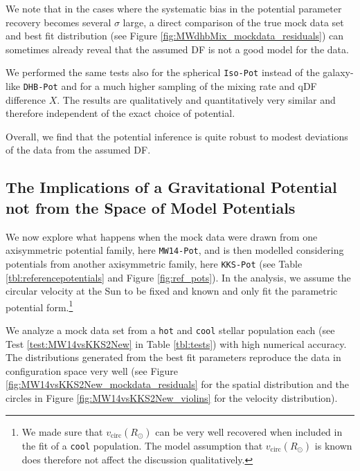 \documentclass[iop,revtex4,numberedappendix,appendixfloats]{emulateapj}
\begin{document}
We note that in the cases where the systematic bias in the potential parameter recovery becomes several $\sigma$ large, a direct comparison of the true mock data set and best fit distribution (see Figure \ref{fig:MWdhbMix_mockdata_residuals}) can sometimes already reveal that the assumed DF is not a good model for the data.

We performed the same tests also for the spherical \texttt{Iso-Pot} instead of the galaxy-like \texttt{DHB-Pot} and for a much higher sampling of the mixing rate and qDF difference $X$. The results are qualitatively and quantitatively very similar and therefore independent of the exact choice of potential.

Overall, we find that the potential inference is quite robust to modest deviations of the data from the assumed DF. 


\subsection{The Implications of a Gravitational Potential not from the Space of Model Potentials} \label{sec:results_potential}

We now explore what happens when the mock data were drawn from one axisymmetric potential family, here \texttt{MW14-Pot}, and is then modelled considering potentials from another axisymmetric family, here \texttt{KKS-Pot} (see Table \ref{tbl:referencepotentials} and Figure \ref{fig:ref_pots}). In the analysis, we assume the circular velocity at the Sun to be fixed and known and only fit the parametric potential form.\footnote{We made sure that $v_\text{circ}(R_\odot)$ can be very well recovered when included in the fit of a \texttt{cool} population. The model assumption that $v_\text{circ}(R_\odot)$ is known does therefore not affect the discussion qualitatively.}

We analyze a mock data set from a \texttt{hot} and \texttt{cool} stellar population each (see Test \ref{test:MW14vsKKS2New} in Table \ref{tbl:tests}) with high numerical accuracy. The distributions generated from the best fit parameters reproduce the data in configuration space very well (see Figure \ref{fig:MW14vsKKS2New_mockdata_residuals} for the spatial distribution and the circles in Figure \ref{fig:MW14vsKKS2New_violins} for the velocity distribution).
\end{document}
